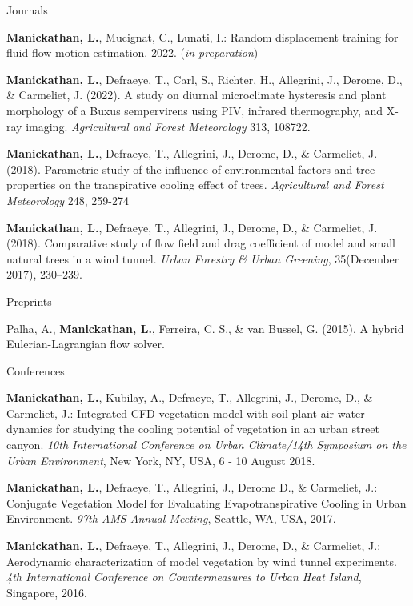 \documentclass[11pt, a4paper]{awesome-cv}
\begin{document}
\begin{cventries}

  \pubentry
  {Journals} %
  {
    \begin{cvitems}
      \item {\textbf{Manickathan, L.}, Mucignat, C., Lunati, I.: Random displacement training for fluid flow motion estimation. 2022. (\textit{in preparation})}
      \item {\textbf{Manickathan, L.}, Defraeye, T., Carl, S., Richter, H., Allegrini, J., Derome, D., \& Carmeliet, J. (2022). A study on diurnal microclimate hysteresis and plant morphology of a Buxus sempervirens using PIV, infrared thermography, and X-ray imaging. \textit{Agricultural and Forest Meteorology} 313, 108722.}
      \item {\textbf{Manickathan, L.}, Defraeye, T., Allegrini, J., Derome, D., \& Carmeliet, J. (2018). Parametric study of the influence of environmental factors and tree properties on the transpirative cooling effect of trees. \textit{Agricultural and Forest Meteorology} 248, 259-274}
      \item {\textbf{Manickathan, L.}, Defraeye, T., Allegrini, J., Derome, D., \& Carmeliet, J. (2018). Comparative study of flow field and drag coefficient of model and small natural trees in a wind tunnel. \textit{Urban Forestry \& Urban Greening}, 35(December 2017), 230–239.}
    \end{cvitems}
  }
  \pubentry
  {Preprints}
  {
    \begin{cvitems}
      \item {Palha, A., \textbf{Manickathan, L.}, Ferreira, C. S., \& van Bussel, G. (2015). A hybrid Eulerian-Lagrangian flow solver.}
    \end{cvitems}
  }
  \pubentry
  {Conferences}
  {
    \begin{cvitems}
      \item {\textbf{Manickathan, L.}, Kubilay, A., Defraeye, T., Allegrini, J., Derome, D., \& Carmeliet, J.: Integrated CFD vegetation model with soil-plant-air water dynamics for studying the cooling potential of vegetation in an urban street canyon. \textit{10th International Conference on Urban Climate/14th Symposium on the Urban Environment}, New York, NY, USA, 6 - 10 August 2018.}
      \item {\textbf{Manickathan, L.}, Defraeye, T., Allegrini, J., Derome D., \& Carmeliet, J.: Conjugate Vegetation Model for Evaluating Evapotranspirative Cooling in Urban Environment. \textit{97th AMS Annual Meeting}, Seattle, WA, USA, 2017.}
      \item {\textbf{Manickathan, L.}, Defraeye, T., Allegrini, J., Derome, D., \& Carmeliet, J.: Aerodynamic characterization of model vegetation by wind tunnel experiments. \textit{4th International Conference on Countermeasures to Urban Heat Island}, Singapore, 2016.}
    \end{cvitems}
  }

\end{cventries}
\end{document}

